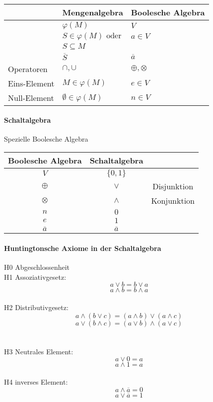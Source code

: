\documentclass[a4paper]{scrartcl}
\begin{document}
				 \begin{table}[H]
				 	\centering
				 	\begin{tabular}{|l|l|l|}
				 		\hline
				 		&Mengenalgebra & Boolesche Algebra\\ \hline
				 		&\( \varphi (M) \) & \( V \) \\
				 		&\( S \in \varphi (M) \text{ oder} \) & \( a \in V \) \\
				 		&\(  S \subseteq M  \)& \\ \hline
				 		&\( \overline{S} \) & \( \overline{a} \) \\
				 		Operatoren &\( \cap , \cup  \) & \( \oplus , \otimes \)  \\
				 		Eins-Element &\( M \in \varphi (M) \) & \( e \in V \)  \\
				 		Null-Element &\( \emptyset \in \varphi(M) \) & \( n \in V \) \\ \hline
				 	\end{tabular}
				 \end{table}				 
				 
				 \paragraph{Schaltalgebra }
				 Spezielle Boolesche Algebra
				 \begin{table}[H]
				 	\centering
				 	\begin{tabular}{|c|c|c|}
				 		\hline
				 		Boolesche Algebra & Schaltalgebra&\\ \hline
				 		\( V \) & \( \{ 0, 1 \}  \) &\\
				 		\( \oplus \) & \( \vee \)  & Disjunktion \\
				 		\( \otimes \) & \( \wedge \)  & Konjunktion\\
				 		\( n \) & \( 0 \)& \\
				 		\( e \) & \( 1 \) &\\ 
				 		\( \overline{a} \) & \( \overline{a} \) &\\ \hline
				 	\end{tabular}
				 \end{table}
				 
				 \paragraph{Huntingtonsche Axiome in der Schaltalgebra}
				 
				 H0 Abgeschlossenheit \\
				 H1 Assoziativgesetz:
				 \[ a \vee b = b \vee a \]
				 \[ a \wedge b = b \wedge a \]
				 \\
				 H2 Distributivgesetz: 
				 \[ a \wedge ( b \vee c) = ( a \wedge b) \vee ( a \wedge c ) \]
				 \[ a \vee ( b \wedge c) = ( a \vee b) \wedge ( a \vee c ) \]\\
				 \\
				 H3 Neutrales Element:
				 \[ a \vee 0 = a \]
				 \[ a \wedge 1 = a \]
				 \\
				 H4 inverses Element:
				 \[ a \wedge \overline{a} = 0 \]
				 \[ a \vee \overline{a} = 1 \]
				 
\end{document}
